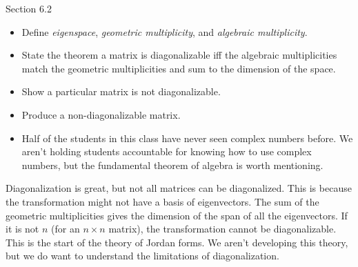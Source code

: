\begin{lesson}

	Section 6.2

	\begin{itemize}
		\item Define \emph{eigenspace}, \emph{geometric multiplicity}, and \emph{algebraic multiplicity}.
		\item State the theorem a matrix is diagonalizable iff the algebraic multiplicities match the geometric
			multiplicities and sum to the dimension of the space.
		\item Show a particular matrix is not diagonalizable.
		\item Produce a non-diagonalizable matrix.
	\end{itemize}

	\begin{annotation}
		\begin{notes}
			\begin{itemize}
				\item Half of the students in this class have never seen complex
					numbers before. We aren't holding students accountable
					for knowing how to use complex numbers, but the fundamental
					theorem of algebra is worth mentioning.
			\end{itemize}
		\end{notes}
	\end{annotation}
	Diagonalization is great, but not all matrices can be diagonalized. This is because the transformation might not
	have a basis of eigenvectors. The sum of the geometric multiplicities gives the dimension of the span
	of all the eigenvectors. If it is not $n$ (for an $n\times n$ matrix), the transformation cannot be diagonalizable.
	This is the start of the theory of Jordan forms. We aren't developing this theory, but we do want to understand
	the limitations of diagonalization.

\end{lesson}

	\bookonlynewpage

